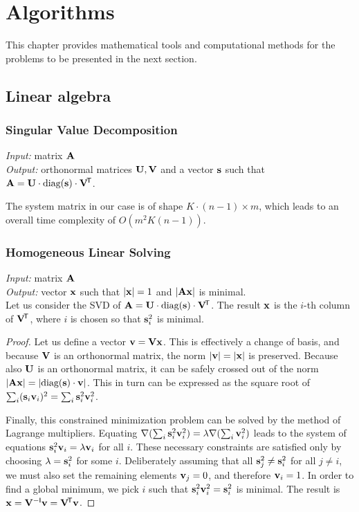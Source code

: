 \chapter{Algorithms}

This chapter provides mathematical tools and computational methods for the problems to be presented in the next section.

\section{Linear algebra}

\subsection{Singular Value Decomposition}
\textit{Input:} matrix $\mathbf{A}$\\
\textit{Output:} orthonormal matrices $\mathbf{U}, \mathbf{V}$ and a vector $\mathbf{s}$ such that $\mathbf{A} = \mathbf{U} \cdot \textrm{diag}(\mathbf{s}) \cdot \mathbf{V}^{\!\mathsf{T}}$.\\


The system matrix in our case is of shape $K \cdot (n - 1) \times m$, which leads to an overall time complexity of $O(m^2 K (n - 1))$.

\subsection{Homogeneous Linear Solving}
\textit{Input:} matrix $\mathbf{A}$\\
\textit{Output:} vector $\mathbf{x}$ such that $|\mathbf{x}| = 1$ and $|\mathbf{A} \mathbf{x}|$ is minimal.\\

Let us consider the SVD of $\mathbf{A} = \mathbf{U} \cdot \textrm{diag}(\mathbf{s}) \cdot \mathbf{V}^{\!\mathsf{T}}$.
The result $\mathbf{x}$ is the $i$-th column of $\mathbf{V} ^{\!\mathsf{T}}$, where $i$ is chosen so that $\mathbf{s}_i^2$ is minimal.

\begin{proof}
Let us define a vector $\mathbf{v} = \mathbf{V} \mathbf{x}$.
This is effectively a change of basis, and because $\mathbf{V}$ is an orthonormal matrix, the norm $|\mathbf{v}| = |\mathbf{x}|$ is preserved.
Because also $\mathbf{U}$ is an orthonormal matrix, it can be safely crossed out of the norm $|\mathbf{A} \mathbf{x}| = |\textrm{diag}(\mathbf{s}) \cdot \mathbf{v}|$.
This in turn can be expressed as the square root of $\sum_i (\mathbf{s}_i \mathbf{v}_i)^2 = \sum_i \mathbf{s}_i^2 \mathbf{v}_i^2$.

Finally, this constrained minimization problem can be solved by the method of Lagrange multipliers.
Equating $\nabla(\sum_i \mathbf{s}_i^2 \mathbf{v}_i^2) = \lambda \nabla (\sum_i \mathbf{v}_i^2)$ leads to the system of equations $\mathbf{s}_i^2 \mathbf{v}_i = \lambda \mathbf{v}_i$ for all $i$.
These necessary constraints are satisfied only by choosing $\lambda = \mathbf{s}_i^2$ for some $i$.
Deliberately assuming that all $\mathbf{s}_j^2 \neq \mathbf{s}_i^2$ for all $j \neq i$, we must also set the remaining elements $\mathbf{v}_j = 0$, and therefore $\mathbf{v}_i = 1$.
In order to find a global minimum, we pick $i$ such that $\mathbf{s}_i^2 \mathbf{v}_i^2 = \mathbf{s}_i^2$ is minimal.
The result is $\mathbf{x} = \mathbf{V} ^{-\mathsf{I}} \mathbf{v} = \mathbf{V} ^{\!\mathsf{T}} \mathbf{v}$.
\end{proof}

